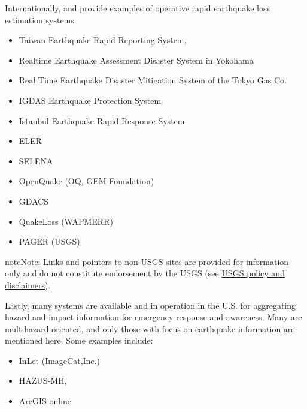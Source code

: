 \documentclass[letterpaper,10pt,english]{sphinxmanual}
\begin{document}
Internationally, {\hyperref[references:erdik2011]{}}
and {\hyperref[references:erdik2014]{}} provide examples of
operative rapid earthquake loss estimation systems.
\begin{itemize}
\item {} 
Taiwan Earthquake Rapid Reporting System,

\item {} 
Realtime Earthquake Assessment Disaster System in Yokohama

\item {} 
Real Time Earthquake Disaster Mitigation System of the Tokyo Gas
Co.

\item {} 
IGDAS Earthquake Protection System

\item {} 
Istanbul Earthquake Rapid Response System

\item {} 
ELER

\item {} 
SELENA

\item {} 
OpenQuake (OQ, GEM Foundation)

\item {} 
GDACS

\item {} 
QuakeLoss (WAPMERR)

\item {} 
PAGER (USGS)

\end{itemize}

\begin{notice}{note}{Note:}
Links and pointers to non-USGS sites are provided for information only and do not constitute endorsement by the USGS (see \href{http://www.usgs.gov/laws/info\_policies.html}{USGS policy and disclaimers}).
\end{notice}

Lastly, many systems are available and in operation in the U.S. for
aggregating hazard and impact information for emergency response and
awareness. Many are multihazard oriented, and only those with focus on
earthquake information are mentioned here. Some examples include:
\begin{itemize}
\item {} 
InLet (ImageCat,Inc.)

\item {} 
HAZUS-MH,

\item {} 
ArcGIS online

\end{itemize}
\end{document}
